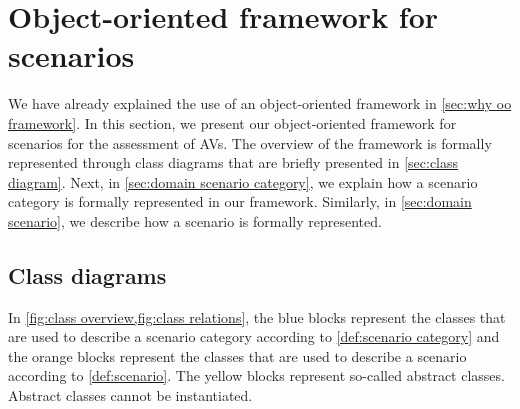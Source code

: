 \cstartb
\section{Object-oriented framework for scenarios}
\label{sec:oo framework}
\cendb

We have already explained the use of an \cstartb object-oriented framework \cendb in \cref{sec:why oo framework}. In this section, we present our \cstartb object-oriented framework \cendb for scenarios for the assessment of AVs. 
The \cstartb overview of the framework \cendb is formally represented through \cstartb class diagrams \cendb that are briefly presented in \cref{sec:class diagram}. Next, in \cref{sec:domain scenario category}, we explain how a scenario category is formally represented \cstartb in our framework\cendb. Similarly, in \cref{sec:domain scenario}, we describe how a scenario is formally represented. 



\cstartb
\subsection{Class diagrams}\cendb
\label{sec:class diagram}

In \cref{fig:class overview,fig:class relations}, the blue blocks represent the classes that are used to describe a scenario category according to \cref{def:scenario category} and the orange blocks represent the classes that are used to describe a scenario according to \cref{def:scenario}. \cstartb The yellow blocks represent so-called abstract classes. Abstract classes cannot be instantiated. \cendb

